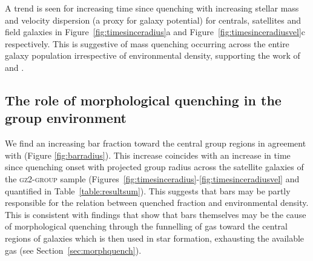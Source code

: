 \documentclass[useAMS,usenatbib]{mn2e}
\begin{document}
A trend is seen for increasing time since quenching with increasing stellar mass and velocity dispersion (a proxy for galaxy potential) for centrals, satellites and field galaxies in Figure~\ref{fig:timesinceradius}a and Figure~\ref{fig:timesinceradiusvel}c respectively. This is suggestive of mass quenching occurring across the entire galaxy population irrespective of environmental density, supporting the work of \citet{peng10, peng12, Gabor10} and \citet{darvish16}.

\subsection{The role of morphological quenching in the group environment}\label{sec:rolemorphenv}

We find an increasing bar fraction toward the central group regions in agreement with \cite{skibba12} (Figure \ref{fig:barradius}). This increase coincides with an increase in time since quenching onset with projected group radius across the satellite galaxies of the \textsc{gz2-group} sample (Figures~\ref{fig:timesinceradius}-\ref{fig:timesinceradiusvel} and quantified in Table~\ref{table:resultsum}). This suggests that bars may be partly responsible for the relation between quenched fraction and environmental density. This is consistent with findings that show that bars themselves may be the cause of morphological quenching through the funnelling of gas toward the central regions of galaxies \citep{athanassoula92b, sheth05} which is then used in star formation, exhausting the available gas (see Section~\ref{sec:morphquench}).

\end{document}
